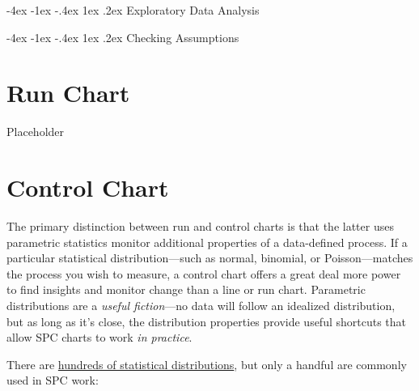 \documentclass[12pt,openany]{book}
\makeatletter
\numberwithin{dummy}{section}
\theoremstyle{ocrenumbox}
\theoremstyle{ocrenumb}
\theoremstyle{blacknumex}
\theoremstyle{blacknumbox}
\theoremstyle{ocrenum}
\renewcommand{\section}{\@startsection{section}{1}{\z@}
{-4ex \@plus -1ex \@minus -.4ex}
{1ex \@plus.2ex }
{\normalfont\large\sffamily\bfseries}}
\makeatother
\begin{document}
\hypertarget{exploratory-data-analysis}{%
\section{Exploratory Data Analysis}\label{exploratory-data-analysis}}

\hypertarget{checking-assumptions}{%
\section{Checking Assumptions}\label{checking-assumptions}}

\hypertarget{run_chart}{%
\chapter{Run Chart}\label{run_chart}}

Placeholder

\hypertarget{control_chart}{%
\chapter{Control Chart}\label{control_chart}}

The primary distinction between run and control charts is that the latter uses parametric statistics monitor additional properties of a data-defined process. If a particular statistical distribution---such as normal, binomial, or Poisson---matches the process you wish to measure, a control chart offers a great deal more power to find insights and monitor change than a line or run chart. Parametric distributions are a \emph{useful fiction}---no data will follow an idealized distribution, but as long as it's close, the distribution properties provide useful shortcuts that allow SPC charts to work \emph{in practice}.

There are \href{https://en.wikipedia.org/wiki/List_of_probability_distributions}{hundreds of statistical distributions}, but only a handful are commonly used in SPC work:
\end{document}
